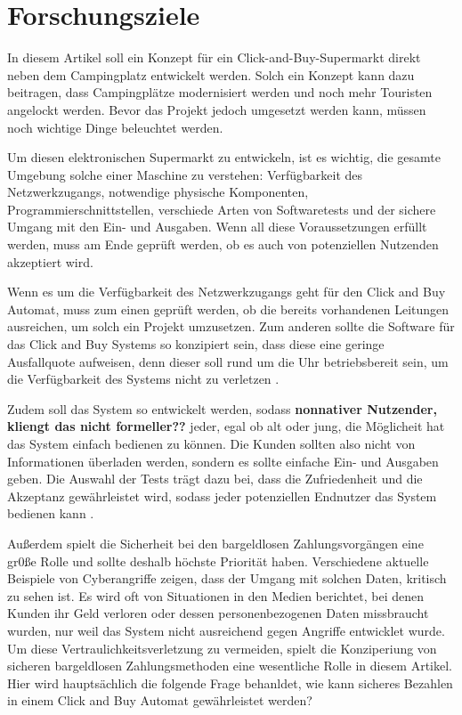 \section{Forschungsziele}


In diesem Artikel soll ein Konzept für ein Click-and-Buy-Supermarkt direkt neben dem Campingplatz 
entwickelt werden. Solch ein Konzept kann dazu beitragen, dass Campingplätze modernisiert werden 
und noch mehr Touristen angelockt werden. Bevor das Projekt jedoch umgesetzt werden kann, müssen 
noch wichtige Dinge beleuchtet werden. 

Um diesen elektronischen Supermarkt zu entwickeln, ist es wichtig, die gesamte Umgebung solche einer Maschine
zu verstehen: Verfügbarkeit des Netzwerkzugangs, notwendige physische Komponenten, Programmierschnittstellen,
verschiede Arten von Softwaretests und der sichere Umgang mit den Ein- und Ausgaben. Wenn all diese 
Voraussetzungen erfüllt werden, muss am Ende geprüft werden, ob es auch von potenziellen Nutzenden 
akzeptiert wird. 

Wenn es um die Verfügbarkeit des Netzwerkzugangs geht für den Click and Buy Automat, muss zum einen 
geprüft werden, ob die bereits vorhandenen Leitungen ausreichen, um solch ein Projekt umzusetzen. Zum anderen 
sollte die Software für das Click and Buy Systems so konzipiert sein, dass diese eine geringe Ausfallquote
aufweisen, denn dieser soll rund um die Uhr betriebsbereit sein, um die Verfügbarkeit des Systems nicht zu
verletzen \cite{refbook:SWIS}.

Zudem soll das System so entwickelt werden, sodass \textbf{nonnativer Nutzender, kliengt das nicht 
formeller??} jeder, egal ob alt oder jung, die Möglicheit hat das System einfach bedienen zu können. 
Die Kunden sollten also nicht von Informationen überladen werden, sondern es sollte einfache Ein- 
und Ausgaben geben. Die Auswahl der Tests trägt dazu bei, dass die Zufriedenheit
und die Akzeptanz gewährleistet wird, sodass jeder potenziellen Endnutzer das System bedienen kann \cite{refbook:IASE}.

Außerdem spielt die Sicherheit bei den bargeldlosen Zahlungsvorgängen eine gr0ße Rolle und sollte deshalb höchste Priorität haben.
Verschiedene aktuelle Beispiele von Cyberangriffe zeigen, dass der Umgang mit solchen 
Daten, kritisch zu sehen ist. Es wird oft von Situationen in den Medien berichtet,
bei denen Kunden ihr Geld verloren oder dessen personenbezogenen Daten missbraucht wurden, nur weil das System
nicht ausreichend gegen Angriffe entwicklet wurde. Um diese Vertraulichkeitsverletzung zu vermeiden, spielt die 
Konziperiung von sicheren bargeldlosen Zahlungsmethoden eine wesentliche Rolle in diesem Artikel. 
Hier wird hauptsächlich die folgende Frage behanldet, wie kann sicheres Bezahlen in einem Click and Buy 
Automat gewährleistet werden?
